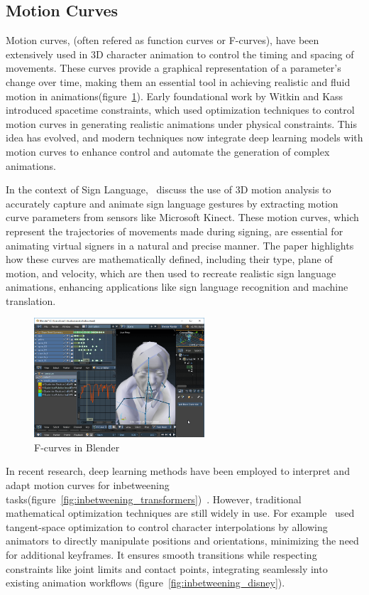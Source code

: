 \documentclass[../../main.tex]{subfiles}
\begin{document}
\subsection{Motion Curves}
\label{ch:intermediate_blocks_pose_correction:related_work:motion_curves}

Motion curves, (often refered as function curves or F-curves), have been extensively used in 3D character animation to control the timing and spacing of movements. These curves provide a graphical representation of a parameter's change over time, making them an essential tool in achieving realistic and fluid motion in animations(figure~\ref{fig:fcurves_blender}). Early foundational work by Witkin and Kass~\cite{witkin1988spacetime} introduced spacetime constraints, which used optimization techniques to control motion curves in generating realistic animations under physical constraints. This idea has evolved, and modern techniques now integrate deep learning models with motion curves to enhance control and automate the generation of complex animations.

In the context of Sign Language,~\cite{inproceedings} discuss the use of 3D motion analysis to accurately capture and animate sign language gestures by extracting motion curve parameters from sensors like Microsoft Kinect. These motion curves, which represent the trajectories of movements made during signing, are essential for animating virtual signers in a natural and precise manner. The paper highlights how these curves are mathematically defined, including their type, plane of motion, and velocity, which are then used to recreate realistic sign language animations, enhancing applications like sign language recognition and machine translation.

\begin{figure}
    \centering \includegraphics[width = 2.5in]{chapters/intermediate_blocks/images/fcurves_blender.png}
    \caption{F-curves in Blender}
    \label{fig:fcurves_blender}
\end{figure}

In recent research, deep learning methods have been employed to interpret and adapt motion curves for inbetweening tasks(figure~\ref{fig:inbetweening_transformers})~\cite{10.1145/3550454.3555454}. However, traditional mathematical optimization techniques are still widely in use. For example~\cite{10.1145/3306346.3322938} used tangent-space optimization to control character interpolations by allowing animators to directly manipulate positions and orientations, minimizing the need for additional keyframes. It ensures smooth transitions while respecting constraints like joint limits and contact points, integrating seamlessly into existing animation workflows (figure~\ref{fig:inbetweening_disney}). 
\end{document}
